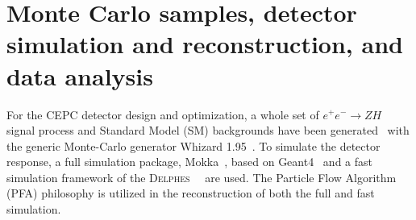 \documentclass[a4paper,10pt,twoside]{cpc-hepnp}
\begin{document}


\section{Monte Carlo samples, detector simulation and reconstruction, and data analysis\label{sec:simulation}}

For the CEPC detector design and optimization, a whole set of $e^+e^- \to ZH$ signal process and Standard Model (SM) backgrounds have been generated~\cite{ref:cepccpc} with the generic Monte-Carlo generator {\sf Whizard 1.95}{~\cite{ref:whizard}}.  To simulate the detector response, a full simulation package, Mokka{~\cite{ref:mokka}}, based on Geant4{~\cite{ref:geant4}} and a fast simulation framework of  the {\textsc{Delphes}~}{~\cite{ref:delphes}} are used.  The Particle Flow Algorithm (PFA) philosophy is utilized in the reconstruction of both the full and fast simulation.
\end{document}
